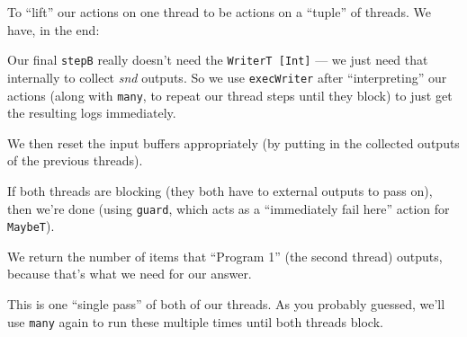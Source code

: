\documentclass[]{article}
\newenvironment{Shaded}{}{}
\newcommand{\CommentTok}[1]{\textcolor[rgb]{0.38,0.63,0.69}{\textit{#1}}}
\newcommand{\DataTypeTok}[1]{\textcolor[rgb]{0.56,0.13,0.00}{#1}}
\newcommand{\FunctionTok}[1]{\textcolor[rgb]{0.02,0.16,0.49}{#1}}
\newcommand{\KeywordTok}[1]{\textcolor[rgb]{0.00,0.44,0.13}{\textbf{#1}}}
\newcommand{\NormalTok}[1]{#1}
\newcommand{\OtherTok}[1]{\textcolor[rgb]{0.00,0.44,0.13}{#1}}
\begin{document}
To ``lift'' our actions on one thread to be actions on a ``tuple'' of threads.
We have, in the end:

\begin{Shaded}
\end{Shaded}

Our final \texttt{stepB} really doesn't need the \texttt{WriterT\ {[}Int{]}} ---
we just need that internally to collect \emph{snd} outputs. So we use
\texttt{execWriter} after ``interpreting'' our actions (along with
\texttt{many}, to repeat our thread steps until they block) to just get the
resulting logs immediately.

We then reset the input buffers appropriately (by putting in the collected
outputs of the previous threads).

If both threads are blocking (they both have to external outputs to pass on),
then we're done (using \texttt{guard}, which acts as a ``immediately fail here''
action for \texttt{MaybeT}).

We return the number of items that ``Program 1'' (the second thread) outputs,
because that's what we need for our answer.

This is one ``single pass'' of both of our threads. As you probably guessed,
we'll use \texttt{many} again to run these multiple times until both threads
block.
\end{document}
